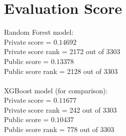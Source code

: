 \section{Evaluation Score}
Random Forest model:\\
Private score = $0.14692$\\
Private score rank = 2172 out of 3303\\
Public score = $0.13378$\\
Public score rank = 2128 out of 3303\\ \\
XGBoost model (for comparison):\\
Private score = $0.11677$\\
Private score rank = 242 out of 3303\\
Public score = $0.10437$\\
Public score rank = 778 out of 3303\\

